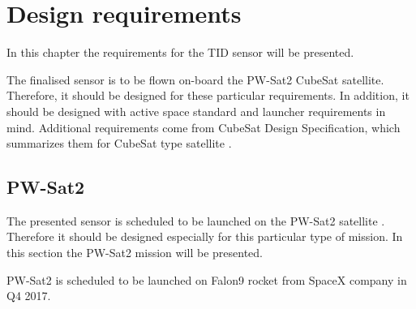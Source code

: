\chapter{Design requirements}
\label{Design_requirements}

In this chapter the requirements for the TID sensor will be presented.

The finalised sensor is to be flown on-board the PW-Sat2 CubeSat satellite. Therefore, it should be designed for these particular requirements. In addition, it should be designed with active space standard and launcher requirements in mind. Additional requirements come from CubeSat Design Specification, which summarizes them for CubeSat type satellite \cite{CDS}.

\section{PW-Sat2}
    The presented sensor is scheduled to be launched on the PW-Sat2 satellite \cite{PW-Sat2URL}. Therefore it should be designed especially for this particular type of mission. In this section the PW-Sat2 mission will be presented.

    PW-Sat2 is scheduled to be launched on Falon9 rocket from SpaceX company in Q4 2017.

